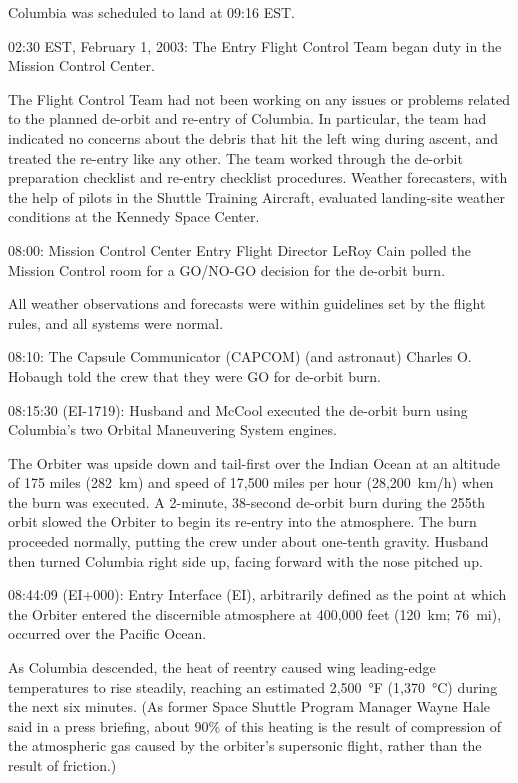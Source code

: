 Columbia was scheduled to land at 09:16 EST.

02:30 EST, February 1, 2003: The Entry Flight Control Team began duty in
the Mission Control Center.

The Flight Control Team had not been working on any issues or problems
related to the planned de-orbit and re-entry of Columbia. In particular,
the team had indicated no concerns about the debris that hit the left
wing during ascent, and treated the re-entry like any other. The team
worked through the de-orbit preparation checklist and re-entry checklist
procedures. Weather forecasters, with the help of pilots in the Shuttle
Training Aircraft, evaluated landing-site weather conditions at the
Kennedy Space Center.

08:00: Mission Control Center Entry Flight Director LeRoy Cain polled
the Mission Control room for a GO/NO-GO decision for the de-orbit burn.

All weather observations and forecasts were within guidelines set by the
flight rules, and all systems were normal.

08:10: The Capsule Communicator (CAPCOM) (and astronaut) Charles O.
Hobaugh told the crew that they were GO for de-orbit burn.

08:15:30 (EI-1719): Husband and McCool executed the de-orbit burn using
Columbia's two Orbital Maneuvering System engines.

The Orbiter was upside down and tail-first over the Indian Ocean at an
altitude of 175 miles (282~km) and speed of 17,500 miles per hour
(28,200~km/h) when the burn was executed. A 2-minute, 38-second de-orbit
burn during the 255th orbit slowed the Orbiter to begin its re-entry
into the atmosphere. The burn proceeded normally, putting the crew under
about one-tenth gravity. Husband then turned Columbia right side up,
facing forward with the nose pitched up.

08:44:09 (EI+000): Entry Interface (EI), arbitrarily defined as the
point at which the Orbiter entered the discernible atmosphere at 400,000
feet (120~km; 76~mi), occurred over the Pacific Ocean.

As Columbia descended, the heat of reentry caused wing leading-edge
temperatures to rise steadily, reaching an estimated 2,500~°F (1,370~°C)
during the next six minutes. (As former Space Shuttle Program Manager
Wayne Hale said in a press briefing, about 90\% of this heating is the
result of compression of the atmospheric gas caused by the orbiter's
supersonic flight, rather than the result of friction.)

